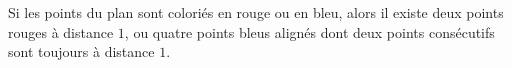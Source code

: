Si les points du plan sont coloriés en rouge ou en bleu, alors il existe deux points rouges à distance $1$, ou quatre points bleus alignés dont deux points consécutifs sont toujours à distance $1$.
